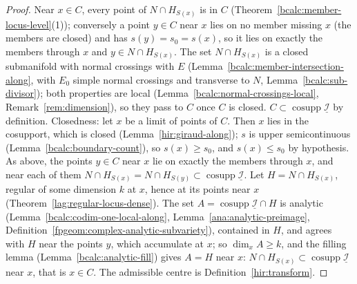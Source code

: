 \begin{proof}
\leanok
Near \(x\in C\), every point of \(N\cap H_{S(x)}\) is in \(C\) (Theorem~\ref{bcalc:member-locus-level}(1)); conversely a point \(y\in C\) near \(x\) lies on no member missing \(x\)
(the members are closed) and has \(s(y)=s_0=s(x)\), so it lies on exactly the members through \(x\) and \(y\in N\cap H_{S(x)}\). The set \(N\cap H_{S(x)}\) is a closed
submanifold with normal crossings with \(E\) (Lemma~\ref{bcalc:member-intersection-along}, with \(E_0\) simple normal crossings and transverse to \(N\),
Lemma~\ref{bcalc:sub-divisor}); both properties are local (Lemma~\ref{bcalc:normal-crossings-local}, Remark~\ref{rem:dimension}), so they pass to \(C\) once \(C\) is closed.
\(C\subset\operatorname{cosupp}\underline{\mathcal I}\) by definition. Closedness: let \(x\) be a limit of points of \(C\). Then \(x\) lies in the cosupport, which is closed
(Lemma~\ref{hir:giraud-along}); \(s\) is upper semicontinuous (Lemma~\ref{bcalc:boundary-count}), so \(s(x)\ge s_0\), and \(s(x)\le s_0\) by hypothesis. As above, the points
\(y\in C\) near \(x\) lie on exactly the members through \(x\), and near each of them \(N\cap H_{S(x)}=N\cap H_{S(y)}\subset\operatorname{cosupp}\underline{\mathcal I}\). Let
\(H=N\cap H_{S(x)}\), regular of some dimension \(k\) at \(x\), hence at its points near \(x\) (Theorem~\ref{lag:regular-locus-dense}). The set
\(A=\operatorname{cosupp}\underline{\mathcal I}\cap H\) is analytic (Lemma~\ref{bcalc:codim-one-local-along}, Lemma~\ref{ana:analytic-preimage},
Definition~\ref{fpgeom:complex-analytic-subvariety}), contained in \(H\), and agrees with \(H\) near the points \(y\), which accumulate at \(x\); so \(\dim_xA\ge k\), and the filling
lemma (Lemma~\ref{bcalc:analytic-fill}) gives \(A=H\) near \(x\): \(N\cap H_{S(x)}\subset\operatorname{cosupp}\underline{\mathcal I}\) near \(x\), that is \(x\in C\). The admissible
centre is Definition~\ref{hir:transform}.
\end{proof}

